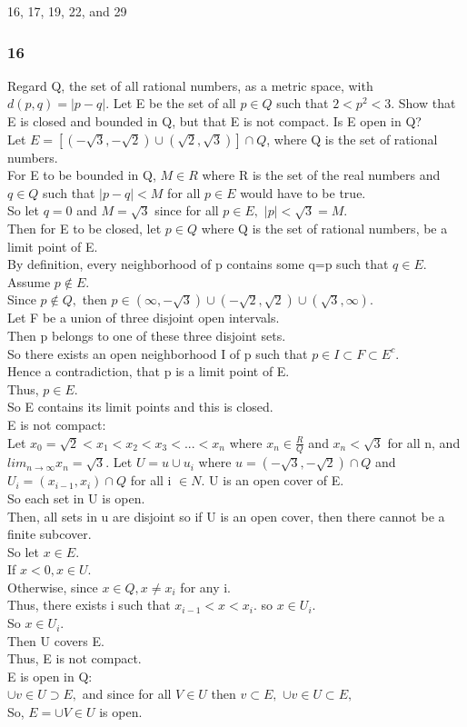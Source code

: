 16, 17, 19, 22, and 29 
\subsubsection*{16}
Regard Q, the set of all rational numbers, as a metric space, with $d(p,q)=|p-q|.$ Let E be the set of all $p \in Q$ such that $2<p^2<3.$ Show that E is closed and bounded in Q, but that E is not compact. Is E open in Q? \\
Let $E= [(-\sqrt{3},-\sqrt{2})\cup (\sqrt{2}, \sqrt{3})] \cap Q$, where Q is the set of rational numbers. \\ 
For E to be bounded in Q, $M \in R$ where R is the set of the real numbers and $q \in Q$ such that $|p-q|<M$ for all $p \in E$ would have to be true. \\ 
So let $q=0$ and $M=\sqrt{3}$ since for all $p \in E,$ $|p|<\sqrt{3}=M.$\\ 
Then for E to be closed, let $p \in Q$ where Q is the set of rational numbers, be a limit point of E. \\ 
By definition, every neighborhood of p contains some q=p such that $q \in E.$\\ 
Assume $p \notin E.$\\ 
Since $p \notin Q,$ then $p \in (\infty, -\sqrt{3}) \cup (-\sqrt{2}, \sqrt{2}) \cup (\sqrt{3}, \infty).$ \\ 
Let F be a union of three disjoint open intervals. \\ 
Then p belongs to one of these three disjoint sets. \\ 
So there exists an open neighborhood I of p such that $p \in I \subset F \subset E^{c}.$\\ 
Hence a contradiction, that p is a limit point of E. \\
Thus, $p \in E.$\\ 
So E contains its limit points and this is closed. \\ 
E is not compact: \\ 
Let $x_{0}=\sqrt{2}<x_1<x_2<x_3<...<x_n$ where $x_n \in \frac{R}{Q}$ and $x_n<\sqrt{3}$ for all n, and $lim_{n \longrightarrow \infty} x_n = \sqrt{3}.$ Let $U = u \cup {u_i}$ where $u=(-\sqrt{3},-\sqrt{2}) \cap Q$ and $U_i=(x_{i-1},x_i) \cap Q $ for all i $\in N.$ U is an open cover of E. \\ 
So each set in U is open. \\ 
Then, all sets in u are disjoint so if U is an open cover, then there cannot be a finite subcover. \\ 
So let $x \in E.$\\ 
If $x<0, x\in U.$\\ 
Otherwise, since $x \in Q, x \neq x_i$ for any i. \\ 
Thus, there exists i such that $x_{i-1}< x< x_{i}.$ so $x \in U_i.$\\ 
So $x \in U_i.$\\ 
Then U covers E. \\ 
Thus, E is not compact.\\ 
E is open in Q: \\ 
$\cup {v \in U} \supset E,$ and since for all $ V \in U$ then $v \subset E,$ $\cup{v \in U}\subset E,$\\ 
So, $E= \cup{V\in U}$ is open. 


